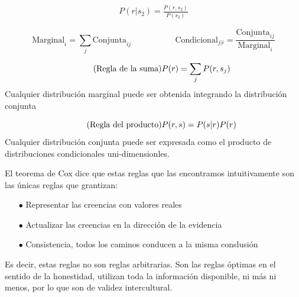 \documentclass[a4paper,10pt]{book}
\begin{document}
\begin{align*}
 P(r|s_2) = \frac{P(r, s_2)}{P(s_2)}
 \end{align*} 
 


\begin{equation*}
  \text{Marginal}_{i} = \sum_j \text{Conjunta}_{ij}  \ \ \ \ \ \ \ \ \  \ \ \ \ \ \ \ \ \ \ \ \ \ \ \  \text{Condicional}_{j|i} = \frac{\text{Conjunta}_{ij}}{\text{Marginal}_{i}}
\end{equation*}


\begin{equation}\tag{\text{Regla de la suma}}
 P(r) = \sum_j P(r,s_j)
\end{equation}
Cualquier distribución marginal puede ser obtenida integrando la distribución conjunta

\begin{equation}\tag{\text{Regla del producto}}
 P(r,s) = P(s|r)P(r)
\end{equation}
Cualquier distribución conjunta puede ser expresada como el producto de distribuciones condicionales uni-dimensionles.

\vspace{0.3cm}

El teorema de Cox \cite{citarbiblio} dice que estas reglas que las encontramos intuitivamente son las únicas reglas que grantizan:
\begin{itemize} \setlength\itemsep{0cm}
 \item[$\bullet$] Representar las creencias con valores reales 
 \item[$\bullet$] Actualizar las creencias en la direcci\'on de la evidencia
 \item[$\bullet$] Consistencia, todos los caminos conducen a la misma conslusión
 \end{itemize}
 
Es decir, estas reglas no son reglas arbitrarias.
Son las reglas óptimas en el sentido de la honestidad, utilizan toda la información disponible, ni más ni menos, por lo que son de validez intercultural.
\end{document}
